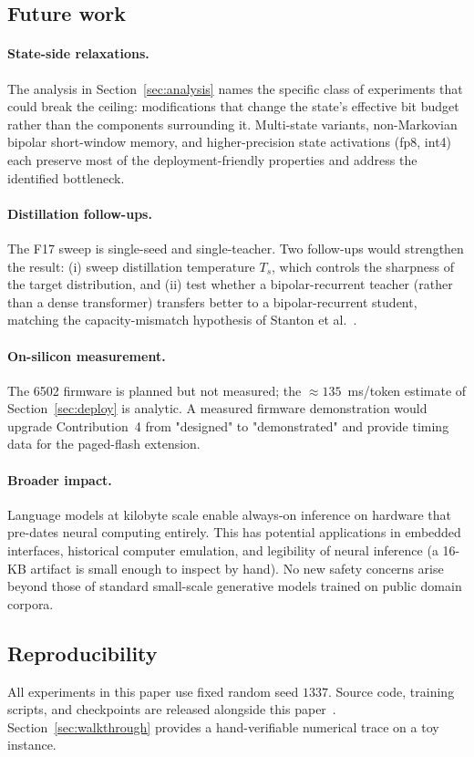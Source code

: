 \documentclass[runningheads]{llncs}
\begin{document}
\subsection{Future work}

\paragraph{State-side relaxations.}
The analysis in Section~\ref{sec:analysis} names the specific class
of experiments that could break the ceiling: modifications that
change the state's effective bit budget rather than the components
surrounding it. Multi-state variants, non-Markovian bipolar
short-window memory, and higher-precision state activations (fp8,
int4) each preserve most of the deployment-friendly properties and
address the identified bottleneck.

\paragraph{Distillation follow-ups.}
The F17 sweep is single-seed and single-teacher. Two follow-ups
would strengthen the result: (i) sweep distillation temperature
$T_{\!s}$, which controls the sharpness of the target distribution,
and (ii) test whether a bipolar-recurrent teacher (rather than a
dense transformer) transfers better to a bipolar-recurrent student,
matching the capacity-mismatch hypothesis of
Stanton et al.~\cite{stanton2021does}.

\paragraph{On-silicon measurement.}
The 6502 firmware is planned but not measured; the
${\approx}135$~ms/token estimate of Section~\ref{sec:deploy} is
analytic. A measured firmware demonstration would upgrade
Contribution~4 from "designed" to "demonstrated" and provide
timing data for the paged-flash extension.

\paragraph{Broader impact.}
Language models at kilobyte scale enable always-on inference on
hardware that pre-dates neural computing entirely. This has
potential applications in embedded interfaces, historical
computer emulation, and legibility of neural inference (a 16-KB
artifact is small enough to inspect by hand).
No new safety concerns arise beyond those of standard small-scale
generative models trained on public domain corpora.

\subsection*{Reproducibility}
All experiments in this paper use fixed random seed $1337$.
Source code, training scripts, and checkpoints are released alongside
this paper~\cite{wozformer2026}. Section~\ref{sec:walkthrough}
provides a hand-verifiable numerical trace on a toy instance.




\end{document}
